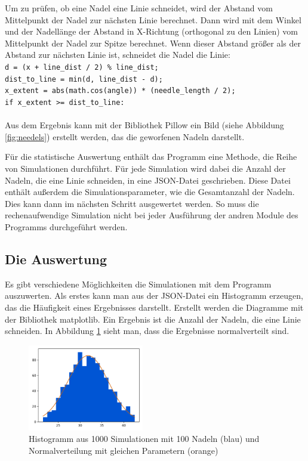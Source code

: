 \documentclass[10pt,twocolumn]{scrartcl}
\begin{document}
		Um zu prüfen, ob eine Nadel eine Linie schneidet, wird der Abstand vom Mittelpunkt der Nadel zur nächsten Linie berechnet. Dann wird mit dem Winkel und der Nadellänge der Abstand in X-Richtung (orthogonal zu den Linien) vom Mittelpunkt der Nadel zur Spitze berechnet. Wenn dieser Abstand größer als der Abstand zur nächsten Linie ist, schneidet die Nadel die Linie:\\
		\texttt{d = (x + line\_dist / 2) \% line\_dist;\\
			dist\_to\_line = min(d, line\_dist - d);\\
			x\_extent = abs(math.cos(angle)) * (needle\_length / 2);\\
			if x\_extent >= dist\_to\_line:}\\
		\\
		Aus dem Ergebnis kann mit der Bibliothek Pillow\cite{Pillow} ein Bild (siehe Abbildung \ref{fig:needels}) erstellt werden, das die geworfenen Nadeln darstellt.

		Für die statistische Auswertung enthält das Programm eine Methode, die Reihe von Simulationen durchführt. Für jede Simulation wird dabei die Anzahl der Nadeln, die eine Linie schneiden, in eine JSON-Datei geschrieben. Diese Datei enthält außerdem die Simulationsparameter, wie die Gesamtanzahl der Nadeln. Dies kann dann im nächsten Schritt ausgewertet werden. So muss die rechenaufwendige Simulation nicht bei jeder Ausführung der andren Module des Programms durchgeführt werden.

	\subsection*{Die Auswertung}
		Es gibt verschiedene Möglichkeiten die Simulationen mit dem Programm auszuwerten. Als erstes kann man aus der JSON-Datei ein Histogramm erzeugen, das die Häufigkeit eines Ergebnisses darstellt. Erstellt werden die Diagramme mit der Bibliothek matplotlib\cite{matplotlib}. Ein Ergebnis ist die Anzahl der Nadeln, die eine Linie schneiden. In Abbildung \ref{fig:hist} sieht man, dass die Ergebnisse normalverteilt sind.

		\begin{figure}[htb]
			\centering
			\includegraphics[width=0.45\textwidth]{images/histogram_1000_no_interval_3.png}
			\caption{Histogramm aus 1000 Simulationen mit 100 Nadeln (blau) und Normalverteilung mit gleichen Parametern (orange)}
			\label{fig:hist}
		\end{figure}
		
\end{document}
